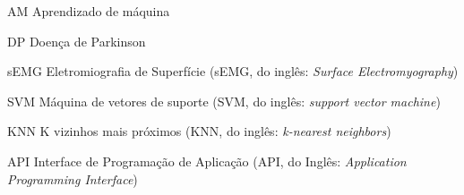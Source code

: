 \begin{siglas}
  \item[AM] Aprendizado de máquina
  \item[DP] Doença de Parkinson
  \item[sEMG] Eletromiografia de Superfície (sEMG, do inglês: \textit{Surface Electromyography})
  \item[SVM] Máquina de vetores de suporte (SVM, do inglês: \textit{support vector machine}) 
  \item[KNN] K vizinhos mais próximos (KNN, do inglês: \textit{k-nearest neighbors}) 
  \item[API] Interface de Programação de Aplicação (API, do Inglês: \textit{Application Programming Interface})
\end{siglas}

